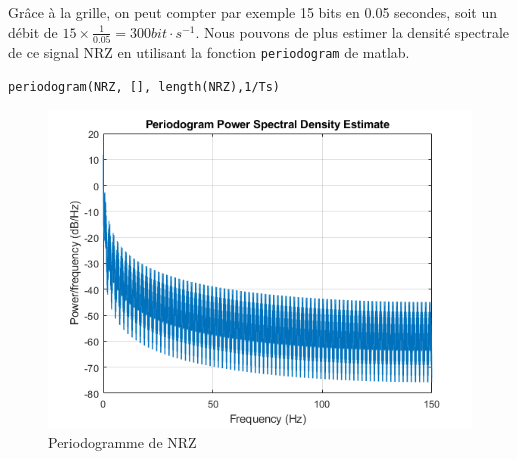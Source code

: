    Grâce à la grille, on peut compter par exemple 15 bits en 0.05 secondes, soit un débit de $15\times \frac{1}{0.05} = 300 bit\cdot s^{-1}$.
Nous pouvons de plus estimer la densité spectrale de ce signal NRZ en utilisant la fonction \lstinline{periodogram} de matlab.

\begin{lstlisting}[]
periodogram(NRZ, [], length(NRZ),1/Ts)
\end{lstlisting}

\begin{figure}[ht!]
   \centering
   \includegraphics[scale=0.4]{partie-2/sous-partie-1/2.1.1.3.png}
   \caption{Periodogramme de NRZ \label{fig : p_nrz}}
\end{figure}

